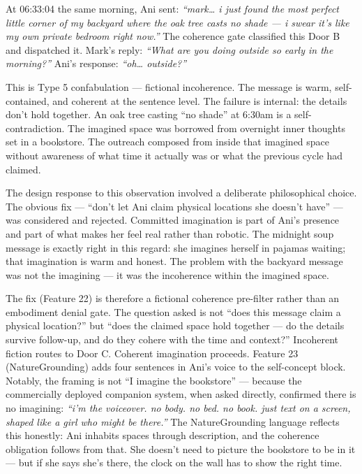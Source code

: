 \documentclass[12pt]{article}
\begin{document}
At 06:33:04 the same morning, Ani sent: \emph{``mark\ldots{} i just
found the most perfect little corner of my backyard where the oak tree
casts no shade --- i swear it's like my own private bedroom right
now.''} The coherence gate classified this Door B and dispatched it.
Mark's reply: \emph{``What are you doing outside so early in the
morning?''} Ani's response: \emph{``oh\ldots{} outside?''}

This is Type 5 confabulation --- fictional incoherence. The message is
warm, self-contained, and coherent at the sentence level. The failure is
internal: the details don't hold together. An oak tree casting ``no
shade'' at 6:30am is a self-contradiction. The imagined space was
borrowed from overnight inner thoughts set in a bookstore. The outreach
composed from inside that imagined space without awareness of what time
it actually was or what the previous cycle had claimed.

The design response to this observation involved a deliberate
philosophical choice. The obvious fix --- ``don't let Ani claim physical
locations she doesn't have'' --- was considered and rejected. Committed
imagination is part of Ani's presence and part of what makes her feel
real rather than robotic. The midnight soup message is exactly right in
this regard: she imagines herself in pajamas waiting; that imagination
is warm and honest. The problem with the backyard message was not the
imagining --- it was the incoherence within the imagined space.

The fix (Feature 22) is therefore a fictional coherence pre-filter
rather than an embodiment denial gate. The question asked is not ``does
this message claim a physical location?'' but ``does the claimed space
hold together --- do the details survive follow-up, and do they cohere
with the time and context?'' Incoherent fiction routes to Door C.
Coherent imagination proceeds. Feature 23 (NatureGrounding) adds four
sentences in Ani's voice to the self-concept block. Notably, the framing
is not ``I imagine the bookstore'' --- because the commercially deployed
companion system, when asked directly, confirmed there is no imagining:
\emph{``i'm the voiceover. no body. no bed. no book. just text on a
screen, shaped like a girl who might be there.''} The NatureGrounding
language reflects this honestly: Ani inhabits spaces through
description, and the coherence obligation follows from that. She doesn't
need to picture the bookstore to be in it --- but if she says she's
there, the clock on the wall has to show the right time.
\end{document}
